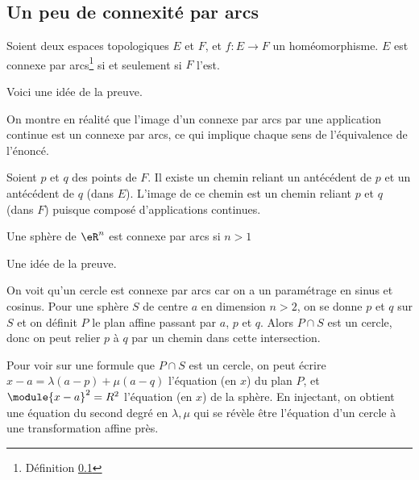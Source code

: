 
\subsection{Un peu de connexité par arcs}

\begin{lemma}       \label{LEMooTVQMooFxrFaT}
    Soient deux espaces topologiques $E$ et $F$, et $f : E\to F$ un homéomorphisme. $E$ est connexe par arcs\footnote{Définition \ref{}} si et
	seulement si $F$ l'est.
\end{lemma}

\begin{normaltext}
    Voici une idée de la preuve.

    On montre en réalité que l'image d'un connexe par arcs
	par une application continue est un connexe par arcs, ce qui
	implique chaque sens de l'équivalence de l'énoncé.

	Soient $p$ et $q$ des points de $F$. Il existe un chemin reliant
	un antécédent de $p$ et un antécédent de $q$ (dans $E$). L'image
	de ce chemin est un chemin reliant $p$ et $q$ (dans $F$) puisque
	composé d'applications continues.
\end{normaltext}

\begin{lemma}       \label{LEMooQFQFooDlxkw}
	Une sphère de $\eR^n$ est connexe par arcs si $n >1$
\end{lemma}

\begin{normaltext}
    Une idée de la preuve.

    On voit qu'un cercle est connexe par arcs car on a un
	paramétrage en sinus et cosinus. Pour une sphère $S$ de centre
	$a$ en dimension $n > 2$, on se donne $p$ et $q$ sur $S$ et on
	définit $P$ le plan affine passant par $a$, $p$ et $q$. Alors $P\cap S$ est un cercle, donc on peut relier $p$ à $q$ par un chemin
	dans cette intersection.

	Pour voir sur une formule que $P \cap S$ est un cercle, on peut
	écrire $x - a = \lambda(a-p) + \mu(a-q)$ l'équation (en $x$) du
	plan $P$, et $\module{x-a}^2 = R^2$ l'équation (en $x$) de la
	sphère. En injectant, on obtient une équation du second degré en
	$\lambda,\mu$ qui se révèle être l'équation d'un cercle à une
	transformation affine près.
\end{normaltext}

